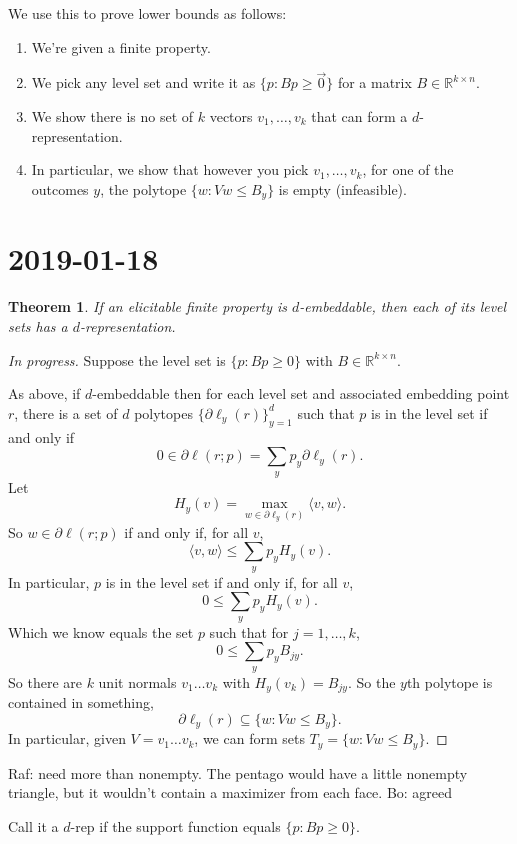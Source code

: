 \documentclass[12pt]{article}
\newtheorem{theorem}{Theorem}
\theoremstyle{definition}
\newcommand{\reals}{\mathbb{R}}
\begin{document}
We use this to prove lower bounds as follows:
\begin{enumerate}
  \item We're given a finite property.
  \item We pick any level set and write it as $\{ p : Bp \geq \vec{0}\}$ for a matrix $B \in \reals^{k \times n}$.
  \item We show there is no set of $k$ vectors $v_1,\dots,v_k$ that can form a $d$-representation.
  \item In particular, we show that however you pick $v_1,\dots,v_k$, for one of the outcomes $y$, the polytope $\{w : Vw \leq B_y \}$ is empty (infeasible).
\end{enumerate}


\break

\section{2019-01-18}

\begin{theorem}
  If an elicitable finite property is $d$-embeddable, then each of its level sets has a $d$-representation.
\end{theorem}
\begin{proof}
  [In progress]
  Suppose the level set is $\{p : Bp \geq 0\}$ with $B \in \reals^{k \times n}$.
  
  As above, if $d$-embeddable then for each level set and associated embedding point $r$, there is a set of $d$ polytopes $\{\partial \ell_y(r)\}_{y=1}^d$ such that $p$ is in the level set if and only if
  \[ 0 \in \partial \ell(r;p) = \sum_y p_y \partial \ell_y(r) . \]
  Let
    \[ H_y(v) = \max_{w \in \partial \ell_y(r)} \langle v , w \rangle . \]
  So $w \in \partial \ell(r;p)$ if and only if, for all $v$,
    \[ \langle v, w\rangle \leq \sum_y p_y H_y(v) . \]
  In particular, $p$ is in the level set if and only if, for all $v$,
    \[ 0 \leq \sum_y p_y H_y(v) . \]
  Which we know equals the set $p$ such that for $j=1,\dots,k$,
    \[ 0 \leq \sum_y p_y B_{jy} . \]
  So there are $k$ unit normals $v_1 \dots v_k$ with $H_y(v_k) = B_{jy}$.
  So the $y$th polytope is contained in something,
    \[ \partial \ell_y(r) \subseteq \{ w : Vw \leq B_y \} . \]
  In particular, given $V = v_1 \dots v_k$, we can form sets $T_y = \{w : Vw \leq B_y\}$.
\end{proof}
  

Raf: need more than nonempty. The pentago would have a little nonempty triangle, but it wouldn't contain a maximizer from each face.
Bo: agreed

Call it a $d$-rep if the support function equals $\{p : Bp \geq 0\}$.
\end{document}
